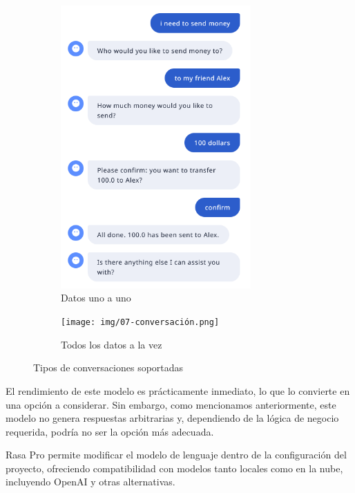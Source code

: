 \documentclass[a4paper,11pt]{article}
\begin{document}
			\begin{figure}[H]
				\centering
				\begin{subfigure}{0.45\textwidth}
					\centering
					\includegraphics[width=0.8\textwidth]{img/06-conversacion1.png}
					\caption{Datos uno a uno}
				\end{subfigure}		
				\hspace{0cm}		
				\begin{subfigure}{0.45\textwidth}
					\centering
					\texttt{[image: img/07-conversación.png]}
					\caption{Todos los datos a la vez}
				\end{subfigure}
				\caption{Tipos de conversaciones soportadas}
				\label{fig:05-conversacion}
			\end{figure}
				
			El rendimiento de este modelo es prácticamente inmediato, lo que lo convierte en una opción a considerar. Sin embargo, como mencionamos anteriormente, este modelo no genera respuestas arbitrarias y, dependiendo de la lógica de negocio requerida, podría no ser la opción más adecuada.  
			
			Rasa Pro permite modificar el modelo de lenguaje dentro de la configuración del proyecto, ofreciendo compatibilidad con modelos tanto locales como en la nube, incluyendo OpenAI y otras alternativas.  
			
\end{document}
